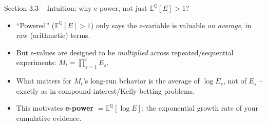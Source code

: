 \documentclass[aspectratio=169,10pt]{beamer}
\newcommand{\QQ}{\mathbb{Q}}
\newcommand{\EE}{\mathbb{E}}
\begin{document}
\begin{frame}{Section 3.3 -- Intuition: why e-power, not just $\EE^\QQ[E]>1$?}
  \begin{itemize}
    \item ``Powered'' ($\EE^\QQ[E]>1$) only says the e-variable is valuable \emph{on average}, in raw (arithmetic) terms.
    \item But e-values are designed to be \emph{multiplied} across repeated/sequential experiments: $M_t = \prod_{s=1}^t E_s$.
    \item What matters for $M_t$'s long-run behavior is the average of $\log E_s$, not of $E_s$ -- exactly as in compound-interest/Kelly-betting problems.
    \item This motivates \textbf{e-power} $=\EE^\QQ[\log E]$: the exponential growth rate of your cumulative evidence.
  \end{itemize}
\end{frame}
\end{document}
